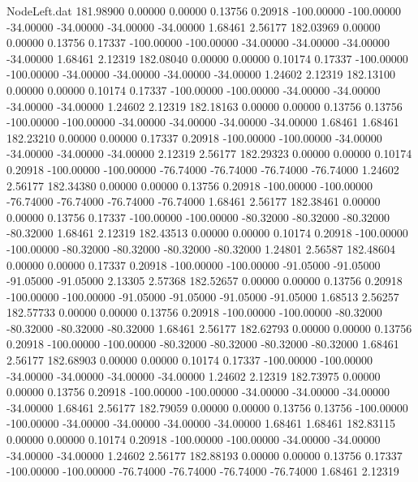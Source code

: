 \begin{filecontents}{NodeLeft.dat}
 181.98900    0.00000    0.00000     0.13756    0.20918 -100.00000 -100.00000  -34.00000  -34.00000  -34.00000  -34.00000    1.68461    2.56177
 182.03969    0.00000    0.00000     0.13756    0.17337 -100.00000 -100.00000  -34.00000  -34.00000  -34.00000  -34.00000    1.68461    2.12319
 182.08040    0.00000    0.00000     0.10174    0.17337 -100.00000 -100.00000  -34.00000  -34.00000  -34.00000  -34.00000    1.24602    2.12319
 182.13100    0.00000    0.00000     0.10174    0.17337 -100.00000 -100.00000  -34.00000  -34.00000  -34.00000  -34.00000    1.24602    2.12319
 182.18163    0.00000    0.00000     0.13756    0.13756 -100.00000 -100.00000  -34.00000  -34.00000  -34.00000  -34.00000    1.68461    1.68461
 182.23210    0.00000    0.00000     0.17337    0.20918 -100.00000 -100.00000  -34.00000  -34.00000  -34.00000  -34.00000    2.12319    2.56177
 182.29323    0.00000    0.00000     0.10174    0.20918 -100.00000 -100.00000  -76.74000  -76.74000  -76.74000  -76.74000    1.24602    2.56177
 182.34380    0.00000    0.00000     0.13756    0.20918 -100.00000 -100.00000  -76.74000  -76.74000  -76.74000  -76.74000    1.68461    2.56177
 182.38461    0.00000    0.00000     0.13756    0.17337 -100.00000 -100.00000  -80.32000  -80.32000  -80.32000  -80.32000    1.68461    2.12319
 182.43513    0.00000    0.00000     0.10174    0.20918 -100.00000 -100.00000  -80.32000  -80.32000  -80.32000  -80.32000    1.24801    2.56587
 182.48604    0.00000    0.00000     0.17337    0.20918 -100.00000 -100.00000  -91.05000  -91.05000  -91.05000  -91.05000    2.13305    2.57368
 182.52657    0.00000    0.00000     0.13756    0.20918 -100.00000 -100.00000  -91.05000  -91.05000  -91.05000  -91.05000    1.68513    2.56257
 182.57733    0.00000    0.00000     0.13756    0.20918 -100.00000 -100.00000  -80.32000  -80.32000  -80.32000  -80.32000    1.68461    2.56177
 182.62793    0.00000    0.00000     0.13756    0.20918 -100.00000 -100.00000  -80.32000  -80.32000  -80.32000  -80.32000    1.68461    2.56177
 182.68903    0.00000    0.00000     0.10174    0.17337 -100.00000 -100.00000  -34.00000  -34.00000  -34.00000  -34.00000    1.24602    2.12319
 182.73975    0.00000    0.00000     0.13756    0.20918 -100.00000 -100.00000  -34.00000  -34.00000  -34.00000  -34.00000    1.68461    2.56177
 182.79059    0.00000    0.00000     0.13756    0.13756 -100.00000 -100.00000  -34.00000  -34.00000  -34.00000  -34.00000    1.68461    1.68461
 182.83115    0.00000    0.00000     0.10174    0.20918 -100.00000 -100.00000  -34.00000  -34.00000  -34.00000  -34.00000    1.24602    2.56177
 182.88193    0.00000    0.00000     0.13756    0.17337 -100.00000 -100.00000  -76.74000  -76.74000  -76.74000  -76.74000    1.68461    2.12319

\end{filecontents}
